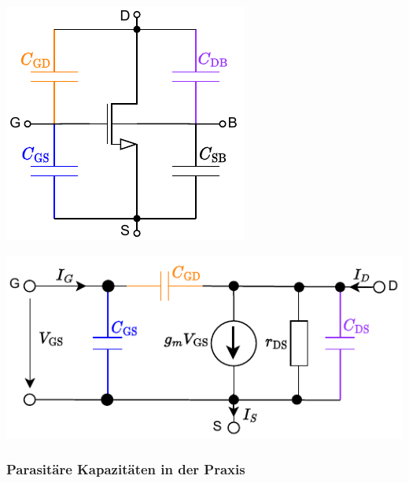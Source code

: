 \begin{minipage}[t]{0.26\columnwidth}
    \includegraphics[width=\columnwidth, align=t]{images/08_parasitaere_C_am_FET.pdf}
\end{minipage}
\hfill
\begin{minipage}[t]{0.6\columnwidth}
    \includegraphics[width=\columnwidth, align=t]{images/08_MOSFET_parasitaere_kapazitaeten_ersatzschaltung.pdf}
\end{minipage}


\subsubsection{Parasitäre Kapazitäten in der Praxis}
\label{Parasitäre Kapazitäten in der Praxis}

